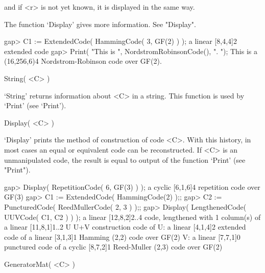 and if <r> is not yet known, it is displayed in the same way.

The function `Display' gives more information. See "Display".

\beginexample
gap> C1 := ExtendedCode( HammingCode( 3, GF(2) ) );
a linear [8,4,4]2 extended code
gap> Print( "This is ", NordstromRobinsonCode(), ". \n");
This is a (16,256,6)4 Nordstrom-Robinson code over GF(2). 
\endexample

\>String( <C> )

`String' returns information about <C> in a string. This function is used
by `Print' (see `Print').

%
%

\>Display( <C> )

`Display' prints  the  method of  construction  of  code <C>.  With  this
history,    in    most cases  an   equal    or equivalent   code   can be
reconstructed. If  <C> is an  unmanipulated code, the  result is equal to
output of the function `Print' (see "Print").

\beginexample
gap> Display( RepetitionCode( 6, GF(3) ) );
a cyclic [6,1,6]4 repetition code over GF(3)
gap> C1 := ExtendedCode( HammingCode(2) );;
gap> C2 := PuncturedCode( ReedMullerCode( 2, 3 ) );;
gap> Display( LengthenedCode( UUVCode( C1, C2 ) ) );
a linear [12,8,2]2..4 code, lengthened with 1 column(s) of
a linear [11,8,1]1..2 U U+V construction code of
U: a linear [4,1,4]2 extended code of
   a linear [3,1,3]1 Hamming (2,2) code over GF(2)
V: a linear [7,7,1]0 punctured code of
   a cyclic [8,7,2]1 Reed-Muller (2,3) code over GF(2)
\endexample


\>GeneratorMat( <C> )

